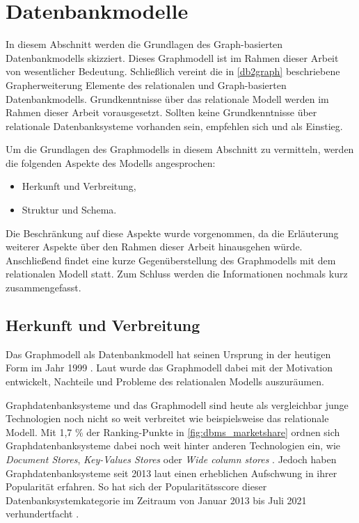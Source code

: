 \section{Datenbankmodelle}
\label{datenmodelle}
In diesem Abschnitt werden die Grundlagen des Graph-basierten Datenbankmodells skizziert. Dieses Graphmodell ist im Rahmen dieser Arbeit von wesentlicher Bedeutung. Schließlich vereint die in \autoref{db2graph} beschriebene Grapherweiterung Elemente des relationalen und Graph-basierten Datenbankmodells. Grundkenntnisse über das relationale Modell werden im Rahmen dieser Arbeit vorausgesetzt. Sollten keine Grundkenntnisse über relationale Datenbanksysteme vorhanden sein, empfehlen sich  und  als Einstieg.

Um die Grundlagen des Graphmodells in diesem Abschnitt zu vermitteln, werden die folgenden Aspekte des Modells angesprochen:
\begin{itemize}
    \item Herkunft und Verbreitung,
    \item Struktur und Schema.
\end{itemize}
Die Beschränkung auf diese Aspekte wurde vorgenommen, da die Erläuterung weiterer Aspekte über den Rahmen dieser Arbeit hinausgehen würde. Anschließend findet eine kurze Gegenüberstellung des Graphmodells mit dem relationalen Modell statt. Zum Schluss werden die Informationen nochmals kurz zusammengefasst. 

\subsection{Herkunft und Verbreitung}
Das Graphmodell als Datenbankmodell hat seinen Ursprung in der heutigen Form im Jahr 1999 \cite{gdbms}. Laut  wurde das Graphmodell dabei mit der Motivation entwickelt, Nachteile und Probleme des relationalen Modells auszuräumen. 

Graphdatenbanksysteme und das Graphmodell sind heute als vergleichbar junge Technologien noch nicht so weit verbreitet wie beispielsweise das relationale Modell. Mit 1,7 \% der Ranking-Punkte in \autoref{fig:dbms_marketshare} ordnen sich Graphdatenbanksysteme dabei noch weit hinter anderen Technologien ein, wie \textit{Document Stores}, \textit{Key-Values Stores} oder \textit{Wide column stores} \cite{db_engines_ranking_july}. Jedoch haben Graphdatenbanksysteme seit 2013 laut  einen erheblichen Aufschwung in ihrer Popularität erfahren. So hat sich der Popularitätsscore dieser Datenbanksystemkategorie im Zeitraum von Januar 2013 bis Juli 2021 verhundertfacht \cite{db_engines_ranking_july}. 

